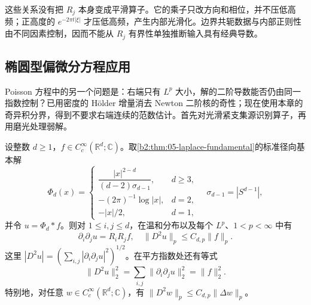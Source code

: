 这些关系没有把 \(R_j\) 本身变成平滑算子。它的乘子只改方向和相位，并不压低高频；正高度的 \(e^{-2\pi t|\xi|}\) 才压低高频，产生内部光滑化。边界共轭数据与内部正则性由不同因素控制，因而不能从 \(R_j\) 有界性单独推断输入具有经典导数。

\subsection{椭圆型偏微分方程应用}
\label{b2:subsec:180504}

Poisson 方程中的另一个问题是：右端只有 \(L^p\) 大小，解的二阶导数能否仍由同一指数控制？已用密度的 Hölder 增量消去 Newton 二阶核的奇性；现在使用本章的奇异积分界，得到不要求右端连续的范数估计。首先对光滑紧支集源识别算子，再用磨光处理弱解。

\begin{proposition}\label{b2:prop:18-newton-second-derivatives}
设整数 \(d\geq1\)，\(f\in C_c^\infty(\mathbb R^d;\mathbb C)\)。取\cref{b2:thm:05-laplace-fundamental}的标准径向基本解
\[
 \Phi_d(x)=
 \begin{cases}
 \dfrac{|x|^{2-d}}{(d-2)\sigma_{d-1}},&d\geq3,\\
 -(2\pi)^{-1}\log|x|,&d=2,\\
 -|x|/2,&d=1,
 \end{cases}
 \quad \sigma_{d-1}=|S^{d-1}|,
\]
并令 \(u=\Phi_d*f\)。则对 \(1\leq i,j\leq d\)，在温和分布以及每个 \(L^p\)、\(1<p<\infty\) 中有
\[
 \partial_i\partial_j u=R_iR_jf,
 \quad \|D^2u\|_p\leq C_{d,p}\|f\|_p.
\]
这里 \(|D^2u|=(\sum_{i,j}|\partial_i\partial_ju|^2)^{1/2}\)。在平方指数处还有等式
\[
 \|D^2u\|_2^2=\sum_{i,j}\|\partial_i\partial_ju\|_2^2=\|f\|_2^2.
\]
特别地，对任意 \(w\in C_c^\infty(\mathbb R^d;\mathbb C)\)，有
\(\|D^2w\|_p\leq C_{d,p}\|\Delta w\|_p\)。
\end{proposition}
